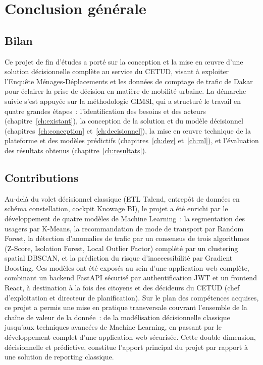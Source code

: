 \chapter*{Conclusion générale}

\section*{Bilan}
Ce projet de fin d'études a porté sur la conception et la mise en œuvre d'une solution décisionnelle complète au service du CETUD, visant à exploiter l'Enquête Ménages-Déplacements et les données de comptage de trafic de Dakar pour éclairer la prise de décision en matière de mobilité urbaine. La démarche suivie s'est appuyée sur la méthodologie GIMSI, qui a structuré le travail en quatre grandes étapes~: l'identification des besoins et des acteurs (chapitre~\ref{ch:existant}), la conception de la solution et du modèle décisionnel (chapitres~\ref{ch:conception} et~\ref{ch:decisionnel}), la mise en œuvre technique de la plateforme et des modèles prédictifs (chapitres~\ref{ch:dev} et~\ref{ch:ml}), et l'évaluation des résultats obtenus (chapitre~\ref{ch:resultats}).

\section*{Contributions}
Au-delà du volet décisionnel classique (ETL Talend, entrepôt de données en schéma constellation, cockpit Knowage BI), le projet a été enrichi par le développement de quatre modèles de Machine Learning~: la segmentation des usagers par K-Means, la recommandation de mode de transport par Random Forest, la détection d'anomalies de trafic par un consensus de trois algorithmes (Z-Score, Isolation Forest, Local Outlier Factor) complété par un clustering spatial DBSCAN, et la prédiction du risque d'inaccessibilité par Gradient Boosting. Ces modèles ont été exposés au sein d'une application web complète, combinant un backend FastAPI sécurisé par authentification JWT et un frontend React, à destination à la fois des citoyens et des décideurs du CETUD (chef d'exploitation et directeur de planification). Sur le plan des compétences acquises, ce projet a permis une mise en pratique transversale couvrant l'ensemble de la chaîne de valeur de la donnée~: de la modélisation décisionnelle classique jusqu'aux techniques avancées de Machine Learning, en passant par le développement complet d'une application web sécurisée. Cette double dimension, décisionnelle et prédictive, constitue l'apport principal du projet par rapport à une solution de reporting classique.

